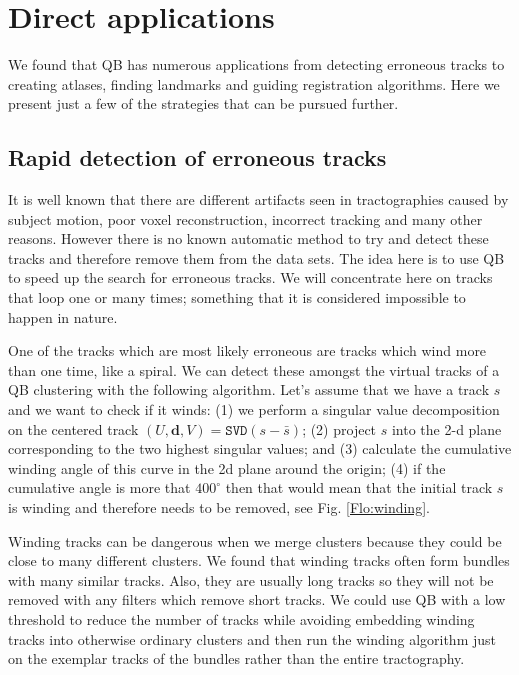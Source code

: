 \documentclass[preprint,authoryear,a4paper,10pt,onecolumn]{elsarticle}
\begin{document}
\section{Direct applications}

We found that QB has numerous applications from detecting erroneous
tracks to creating atlases, finding landmarks and guiding registration
algorithms. Here we present just a few of the strategies that can be
pursued further.


\subsection{Rapid detection of erroneous tracks}

It is well known that there are different artifacts seen in
tractographies caused by subject motion, poor voxel reconstruction,
incorrect tracking and many other reasons. However there is no known
automatic method to try and detect these tracks and therefore remove
them from the data sets. The idea here is to use QB to speed up the
search for erroneous tracks. We will concentrate here on tracks that
loop one or many times; something that it is considered impossible to
happen in nature.

One of the tracks which are most likely erroneous are tracks which wind
more than one time, like a spiral. We can detect these amongst the
virtual tracks of a QB clustering with the following algorithm. Let's
assume that we have a track $s$ and we want to check if it winds: (1) we
perform a singular value decomposition on the centered track
$(U,\mathbf{d},V)=\mathtt{SVD}(s-\bar{s})$; (2) project $s$ into the 2-d
plane corresponding to the two highest singular values; and (3)
calculate the cumulative winding angle of this curve in the 2d plane
around the origin; (4) if the cumulative angle is more that
$400^{\circ}$ then that would mean that the initial track $s$ is winding
and therefore needs to be removed, see Fig. \ref{Flo:winding}.

Winding tracks can be dangerous when we merge clusters because they
could be close to many different clusters. We found that winding tracks
often form bundles with many similar tracks. Also, they are usually long
tracks so they will not be removed with any filters which remove short
tracks. We could use QB with a low threshold to reduce the number of
tracks while avoiding embedding winding tracks into otherwise ordinary
clusters and then run the winding algorithm just on the exemplar tracks
of the bundles rather than the entire tractography.
\end{document}
